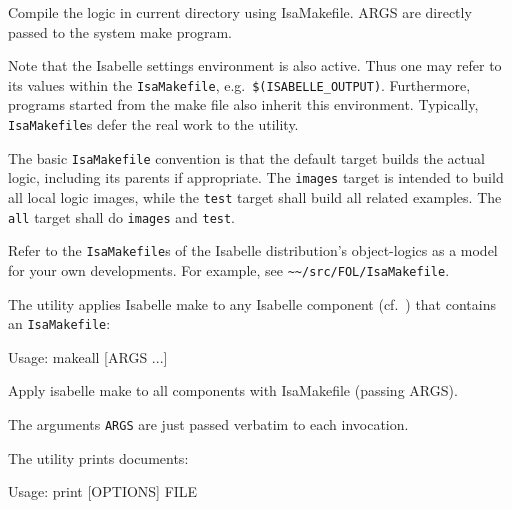 \begin{isabellebody}
\begin{isamarkuptext}
\begin{ttbox}
  Compile the logic in current directory using IsaMakefile.
  ARGS are directly passed to the system make program.
\end{ttbox}

  Note that the Isabelle settings environment is also active. Thus one
  may refer to its values within the \verb|IsaMakefile|, e.g.\
  \verb|$(ISABELLE_OUTPUT)|. Furthermore, programs started from
  the make file also inherit this environment.  Typically, \verb|IsaMakefile|s defer the real work to the \hyperlink{tool.usedir}{\mbox{}} utility.

  \medskip The basic \verb|IsaMakefile| convention is that the
  default target builds the actual logic, including its parents if
  appropriate.  The \verb|images| target is intended to build all
  local logic images, while the \verb|test| target shall build
  all related examples.  The \verb|all| target shall do
  \verb|images| and \verb|test|.%
\end{isamarkuptext}%
\isamarkuptrue%
%
\isamarkuptrue%
%
\begin{isamarkuptext}%
Refer to the \verb|IsaMakefile|s of the Isabelle distribution's
  object-logics as a model for your own developments.  For example,
  see \verb|~~/src/FOL/IsaMakefile|.%
\end{isamarkuptext}%
\isamarkuptrue%
%
\isamarkuptrue%
%
\begin{isamarkuptext}%
The \hypertarget{tool.makeall}{\hyperlink{tool.makeall}{\mbox{}}} utility applies Isabelle make to any
  Isabelle component (cf.\ \secref{sec:components}) that contains an
  \verb|IsaMakefile|:
\begin{ttbox}
Usage: makeall [ARGS ...]

  Apply isabelle make to all components with IsaMakefile (passing ARGS).
\end{ttbox}

  The arguments \verb|ARGS| are just passed verbatim to each
  \hyperlink{tool.make}{\mbox{}} invocation.%
\end{isamarkuptext}%
\isamarkuptrue%
%
\isamarkuptrue%
%
\begin{isamarkuptext}%
The \hypertarget{tool.print}{\hyperlink{tool.print}{\mbox{}}} utility prints documents:
\begin{ttbox}
Usage: print [OPTIONS] FILE


\end{ttbox}
\end{isamarkuptext}
\end{isabellebody}
